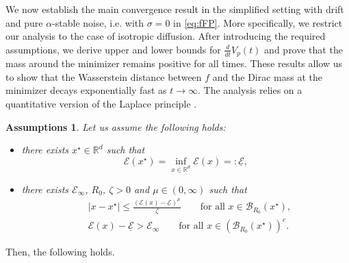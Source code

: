 \documentclass[11pt,handout]{article}%
\numberwithin{equation}{section}
\newcommand{\R}{\mathbb R}
\newtheorem{assumptions}{Assumptions}
\theoremstyle{definition}
\begin{document}
We now establish the main convergence result in the simplified setting with drift and pure $\alpha$-stable noise, i.e. with $\sigma = 0$ in \eqref{eq:fFP}. More specifically, we restrict our analysis to the case of isotropic diffusion. After introducing the required assumptions, we derive upper and lower bounds for $\frac{d}{dt}V_p(t)$ and prove that the mass around the minimizer remains positive for all times. These results allow us to show that the Wasserstein distance between $f$ and the Dirac mass at the minimizer decays exponentially fast as $t\to\infty$. The analysis relies on a quantitative version of the Laplace principle \cite{fornasier2024consensus}.
\begin{assumptions}\label{prop:assumptions} 
	Let us assume the following holds:
	\begin{itemize} 
		\item there exists $x^\star\in \R^d$ such that 
		\begin{equation*}
			\mathcal{E}(x^\star) = \inf_{x\in\R^d} \mathcal{E}(x) =: \underline{\mathcal{E}}, 
		\end{equation*}
		\item there exists $\mathcal{E}_\infty$, $R_0$, $\zeta>0$ and $\mu\in(0,\infty)$ such that
		\begin{equation}
			\begin{split}
				&\vert x-x^\star \vert \leq \frac{(\mathcal{E}(x)-\underline{\mathcal{E}})^\mu}{\zeta} \qquad \text{for all } x\in \mathcal{B}_{R_0}(x^\star),\\  
				&\mathcal{E}(x)-\underline{\mathcal{E}} > \mathcal{E}_\infty \qquad \text{for all } x\in \left( \mathcal{B}_{R_0}(x^\star)\right)^c. 
			\end{split}
		\end{equation} 
	\end{itemize}
\end{assumptions}
Then, the following holds.  
\end{document}
